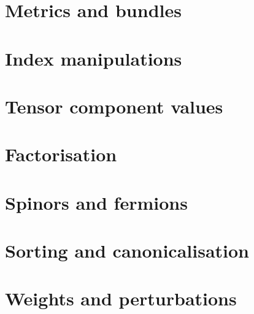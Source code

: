 \documentclass[11pt]{book}
\begin{document}








\section{Metrics and bundles}









\section{Index manipulations}











\section{Tensor component values}




\section{Factorisation}




\section{Spinors and fermions}







\section{Sorting and canonicalisation}
  








\section{Weights and perturbations}
\end{document}
